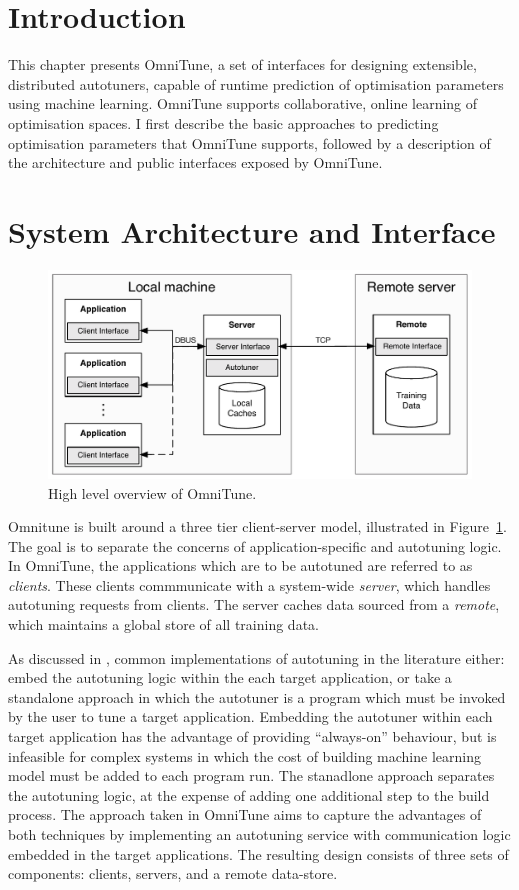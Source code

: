 \section{Introduction}

This chapter presents OmniTune, a set of interfaces for designing
extensible, distributed autotuners, capable of runtime prediction of
optimisation parameters using machine learning. OmniTune supports
collaborative, online learning of optimisation spaces. I first
describe the basic approaches to predicting optimisation parameters
that OmniTune supports, followed by a description of the architecture
and public interfaces exposed by OmniTune.


\section{System Architecture and Interface}

\begin{figure}
\centering
\includegraphics[width=.9\textwidth]{img/omnitune-system-overview.pdf}
\caption{%
  High level overview of OmniTune.%
}
\label{fig:omnitune-system-overview}
\end{figure}

Omnitune is built around a three tier client-server model, illustrated
in Figure~\ref{fig:omnitune-system-overview}. The goal is to separate
the concerns of application-specific and autotuning logic. In
OmniTune, the applications which are to be autotuned are referred to
as \emph{clients}. These clients commmunicate with a system-wide
\emph{server}, which handles autotuning requests from clients. The
server caches data sourced from a \emph{remote}, which maintains a
global store of all training data.

As discussed in , common implementations of
autotuning in the literature either: embed the autotuning logic within
the each target application, or take a standalone approach in which
the autotuner is a program which must be invoked by the user to tune a
target application. Embedding the autotuner within each target
application has the advantage of providing ``always-on'' behaviour,
but is infeasible for complex systems in which the cost of building
machine learning model must be added to each program run. The
stanadlone approach separates the autotuning logic, at the expense of
adding one additional step to the build process. The approach taken in
OmniTune aims to capture the advantages of both techniques by
implementing an autotuning service with communication logic embedded
in the target applications. The resulting design consists of three
sets of components: clients, servers, and a remote data-store.

